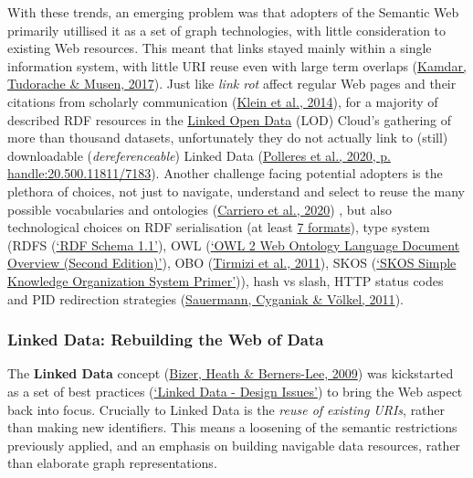 With these trends, an emerging problem was that adopters of the Semantic Web primarily utillised it as a set of graph technologies, with little consideration to existing Web resources. This meant that links stayed mainly within a single information system, with little URI reuse even with large term overlaps (\protect\hyperlink{ref-9CdJnsoJ}{Kamdar, Tudorache \& Musen, 2017}). Just like \emph{link rot} affect regular Web pages and their citations from scholarly communication (\protect\hyperlink{ref-AGHR9oyr}{Klein et al., 2014}), for a majority of described RDF resources in the \href{https://lod-cloud.net/}{Linked Open Data} (LOD) Cloud's gathering of more than thousand datasets, unfortunately they do not actually link to (still) downloadable (\emph{dereferenceable}) Linked Data (\protect\hyperlink{ref-5SuwLNdE}{Polleres et al., 2020, p. handle:20.500.11811/7183}). Another challenge facing potential adopters is the plethora of choices, not just to navigate, understand and select to reuse the many possible vocabularies and ontologies (\protect\hyperlink{ref-TUmA4KQT}{Carriero et al., 2020}) , but also technological choices on RDF serialisation (at least \href{https://www.w3.org/TR/rdf11-primer/\#section-graph-syntax}{7 formats}), type system (RDFS (\protect\hyperlink{ref-ZwAcGQKY}{{`RDF Schema 1.1'}}), OWL (\protect\hyperlink{ref-1p4IWJpI}{{`OWL 2 Web Ontology Language Document Overview (Second Edition)'}}), OBO (\protect\hyperlink{ref-1DalZuKct}{Tirmizi et al., 2011}), SKOS (\protect\hyperlink{ref-15gQDya5B}{{`SKOS Simple Knowledge Organization System Primer'}})), hash vs slash, HTTP status codes and PID redirection strategies (\protect\hyperlink{ref-rnzJ4khD}{Sauermann, Cyganiak \& Völkel, 2011}).

\hypertarget{sec:ld-web}{%
\subsubsection{Linked Data: Rebuilding the Web of Data}\label{sec:ld-web}}

The \textbf{Linked Data} concept (\protect\hyperlink{ref-19s3yyxDn}{Bizer, Heath \& Berners-Lee, 2009}) was kickstarted as a set of best practices (\protect\hyperlink{ref-OGXYtGZ8}{{`Linked Data - Design Issues'}}) to bring the Web aspect back into focus. Crucially to Linked Data is the \emph{reuse of existing URIs}, rather than making new identifiers. This means a loosening of the semantic restrictions previously applied, and an emphasis on building navigable data resources, rather than elaborate graph representations.

